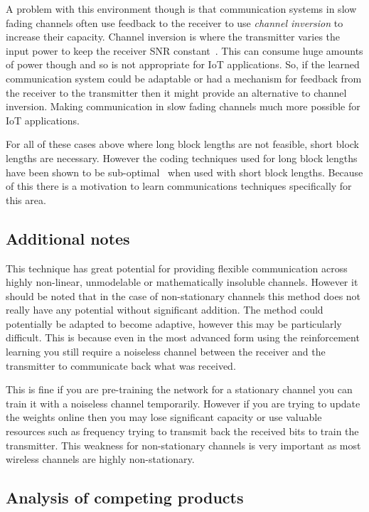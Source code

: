 \documentclass[12pt,onecolumn,letterpaper]{article}
\begin{document}
A problem with this environment though is that communication systems in slow fading channels often use feedback to the receiver to use \textit{channel inversion} to increase their capacity. Channel inversion is where the transmitter varies the input power to keep the receiver SNR constant~\cite{WirelessTextbookC5}. This can consume huge amounts of power though and so is not appropriate for IoT applications. So, if the learned communication system could be adaptable or had a mechanism for feedback from the receiver to the transmitter then it might provide an alternative to channel inversion. Making communication in slow fading channels much more possible for IoT applications.

For all of these cases above where long block lengths are not feasible, short block lengths are necessary. However the coding techniques used for long block lengths have been shown to be sub-optimal~\cite{ShortBlockLengthNonOptimality} when used with short block lengths. Because of this there is a motivation to learn communications techniques specifically for this area.

\subsection{Additional notes}

This technique has great potential for providing flexible communication across highly non-linear, unmodelable or mathematically insoluble channels. However it should be noted that in the case of non-stationary channels this method does not really have any potential without significant addition. The method could potentially be adapted to become adaptive, however this may be particularly difficult. This is because even in the most advanced form using the reinforcement learning you still require a noiseless channel between the receiver and the transmitter to communicate back what was received. 

This is fine if you are pre-training the network for a stationary channel you can train it with a noiseless channel temporarily. However if you are trying to update the weights online then you may lose significant capacity or use valuable resources such as frequency trying to transmit back the received bits to train the transmitter. This weakness for non-stationary channels is very important as most wireless channels are highly non-stationary. 

\subsection{Analysis of competing products}
\end{document}
